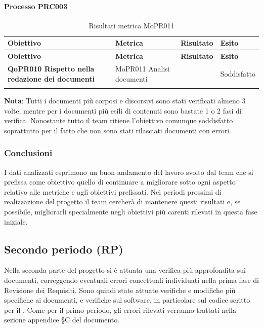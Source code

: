 \documentclass[../piano-di-qualifica.tex]{subfiles}
\begin{document}
\paragraph{Processo PRC003}
\label{sub:processo_PRC003}

\renewcommand{\arraystretch}{2} %
\begin{longtable}[H]{>{\centering\bfseries}m{5cm} >{\centering}m{5cm} >{\centering}m{2.5cm} >{\centering\arraybackslash}m{2.5cm}}  
  \rowcolor{lightgray}
  {\textbf{Obiettivo}} & {\textbf{Metrica}} & {\textbf{Risultato}} & {\textbf{Esito}}  \\
  \endfirsthead%
  \rowcolor{lightgray}
  {\textbf{Obiettivo}} & {\textbf{Metrica}} & {\textbf{Risultato}} & {\textbf{Esito}}  \\
  \endhead%
  \textbf{QoPR010 Rispetto nella redazione dei documenti} & MoPR011 Analisi documenti & 3 & Soddisfatto \\
  \caption{Risultati metrica MoPR011}
  \label{tab:my-table}
\end{longtable}
\textbf{Nota}: Tutti i documenti più corposi e discorsivi sono stati verificati almeno 3 volte, mentre per i documenti più esili di contenuti sono bastate 1 o 2 fasi di verifica. Nonostante tutto il team ritiene l'obiettivo comunque soddisfatto soprattutto per il fatto che non sono stati rilasciati documenti con errori.

\subsubsection{Conclusioni}%
\label{sub:conclusioni}
I dati analizzati esprimono un buon andamento del lavoro svolto dal team che si prefissa come obiettivo quello di continuare a migliorare sotto ogni aspetto relativo alle metriche e agli obiettivi prefissati.
Nei periodi prossimi di realizzazione del progetto il team cercherà di mantenere questi risultati e, se possibile, migliorarli specialmente negli obiettivi più carenti rilevati in questa fase iniziale.

\subsection{Secondo periodo (RP)}
\label{sub:secondo_periodo}
Nella seconda parte del progetto si è attuata una verifica più approfondita sui documenti, correggendo eventuali errori concettuali individuati nella prima fase di Revisione dei Requisiti.
Sono quindi state attuate verifiche e modifiche più specifiche ai documenti, e verifiche sul software, in particolare sul codice scritto per il .
Come per il primo periodo, gli errori rilevati verranno trattati nella sezione appendice §C del documento.
\end{document}

